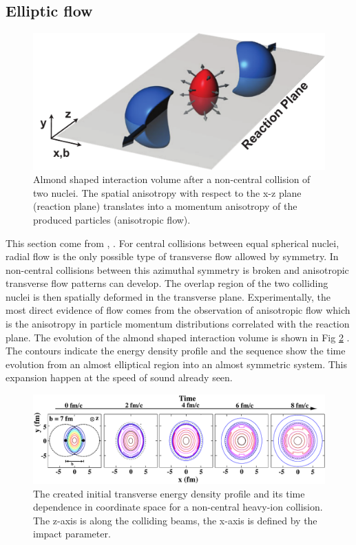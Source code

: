 \documentclass[12pt,a4paper]{book}
\begin{document}
	\subsection{Elliptic flow}
	\begin{figure}[ht]
		\centering
		\includegraphics[width=0.8\linewidth]{pictures/elliptic_flow_collision.pdf}
		\caption{Almond shaped interaction volume after a non-central collision of two nuclei. The spatial anisotropy with respect to the x-z plane (reaction plane) translates into a momentum anisotropy of the produced particles (anisotropic flow).}
		\label{fig:elliptic_flow_collision} 
	\end{figure}
	This section come from \cite{Snellings_2011}, \cite{heinz2004conceptsheavyionphysics} \cite{Kolb_2000}. 
	For central collisions between equal spherical nuclei, radial flow is the only possible type of transverse flow allowed by symmetry. In non-central collisions between this azimuthal symmetry is broken and anisotropic transverse flow patterns can develop. The overlap region of the two colliding nuclei is then spatially deformed in the transverse plane. Experimentally, the most direct evidence of flow comes from the observation of anisotropic flow which is the anisotropy in particle momentum distributions correlated with the reaction plane. The evolution of the almond shaped interaction volume is shown in Fig \ref{fig:time_evolution_perepheral} \cite{kolb2003hydrodynamicdescriptionultrarelativisticheavyion}. The contours indicate the energy density profile and the sequence show the time evolution from an almost elliptical region into an almost symmetric system. This expansion happen at the speed of sound already seen. 
	\begin{figure}[ht]
		\centering
		\includegraphics[width=0.8\linewidth]{pictures/timeEvolutionPerepheral.pdf}
		\caption{The created initial transverse energy density profile and its time	dependence in coordinate space for a non-central heavy-ion collision. The z-axis is along the colliding beams, the x-axis is defined by the impact parameter.}
		\label{fig:time_evolution_perepheral} 
	\end{figure}
\end{document}
